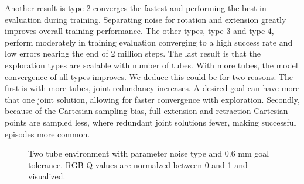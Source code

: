 Another result is type 2 converges the fastest and performing the best in evaluation during training. Separating noise for rotation and extension greatly improves overall training performance. The other types, type 3 and type 4, perform moderately in training evaluation converging to a high success rate and low errors nearing the end of 2 million steps. The last result is that the exploration types are scalable with number of tubes. With more tubes, the model convergence of all types improves. We deduce this could be for two reasons. The first is with more tubes, joint redundancy increases. A desired goal can have more that one joint solution, allowing for faster convergence with exploration. Secondly, because of the Cartesian sampling bias, full extension and retraction Cartesian points are sampled less, where redundant joint solutions fewer, making successful episodes more common.
\begin{figure}
    \caption{Two tube environment with parameter noise type and 0.6 mm goal tolerance. RGB Q-values are normalzed between 0 and 1 and visualized.}
    \label{fig:two-tube-pcl}
\end{figure}

